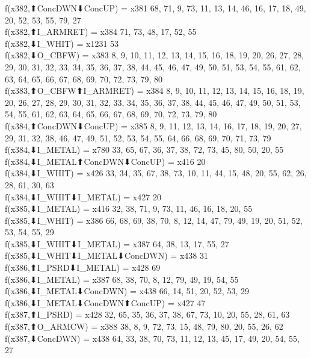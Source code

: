 f(x382,⬆ConcDWN⬇ConcUP) = x381 {68, 71, 9, 73, 11, 13, 14, 46, 16, 17, 18, 49, 20, 52, 53, 55, 79, 27} \\
f(x382,⬆I_ARMRET) = x384 {71, 73, 48, 17, 52, 55} \\
f(x382,⬇I_WHIT) = x1231 {53} \\
f(x382,⬇O_CBFW) = x383 {8, 9, 10, 11, 12, 13, 14, 15, 16, 18, 19, 20, 26, 27, 28, 29, 30, 31, 32, 33, 34, 35, 36, 37, 38, 44, 45, 46, 47, 49, 50, 51, 53, 54, 55, 61, 62, 63, 64, 65, 66, 67, 68, 69, 70, 72, 73, 79, 80} \\
f(x383,⬆O_CBFW⬆I_ARMRET) = x384 {8, 9, 10, 11, 12, 13, 14, 15, 16, 18, 19, 20, 26, 27, 28, 29, 30, 31, 32, 33, 34, 35, 36, 37, 38, 44, 45, 46, 47, 49, 50, 51, 53, 54, 55, 61, 62, 63, 64, 65, 66, 67, 68, 69, 70, 72, 73, 79, 80} \\
f(x384,⬆ConcDWN⬇ConcUP) = x385 {8, 9, 11, 12, 13, 14, 16, 17, 18, 19, 20, 27, 29, 31, 32, 38, 46, 47, 49, 51, 52, 53, 54, 55, 64, 66, 68, 69, 70, 71, 73, 79} \\
f(x384,⬇I_METAL) = x780 {33, 65, 67, 36, 37, 38, 72, 73, 45, 80, 50, 20, 55} \\
f(x384,⬇I_METAL⬆ConcDWN⬇ConcUP) = x416 {20} \\
f(x384,⬇I_WHIT) = x426 {33, 34, 35, 67, 38, 73, 10, 11, 44, 15, 48, 20, 55, 62, 26, 28, 61, 30, 63} \\
f(x384,⬇I_WHIT⬇I_METAL) = x427 {20} \\
f(x385,⬇I_METAL) = x416 {32, 38, 71, 9, 73, 11, 46, 16, 18, 20, 55} \\
f(x385,⬇I_WHIT) = x386 {66, 68, 69, 38, 70, 8, 12, 14, 47, 79, 49, 19, 20, 51, 52, 53, 54, 55, 29} \\
f(x385,⬇I_WHIT⬇I_METAL) = x387 {64, 38, 13, 17, 55, 27} \\
f(x385,⬇I_WHIT⬇I_METAL⬇ConcDWN) = x438 {31} \\
f(x386,⬆I_PSRD⬇I_METAL) = x428 {69} \\
f(x386,⬇I_METAL) = x387 {68, 38, 70, 8, 12, 79, 49, 19, 54, 55} \\
f(x386,⬇I_METAL⬇ConcDWN) = x438 {66, 14, 51, 20, 52, 53, 29} \\
f(x386,⬇I_METAL⬇ConcDWN⬆ConcUP) = x427 {47} \\
f(x387,⬆I_PSRD) = x428 {32, 65, 35, 36, 37, 38, 67, 73, 10, 20, 55, 28, 61, 63} \\
f(x387,⬆O_ARMCW) = x388 {38, 8, 9, 72, 73, 15, 48, 79, 80, 20, 55, 26, 62} \\
f(x387,⬇ConcDWN) = x438 {64, 33, 38, 70, 73, 11, 12, 13, 45, 17, 49, 20, 54, 55, 27} \\
